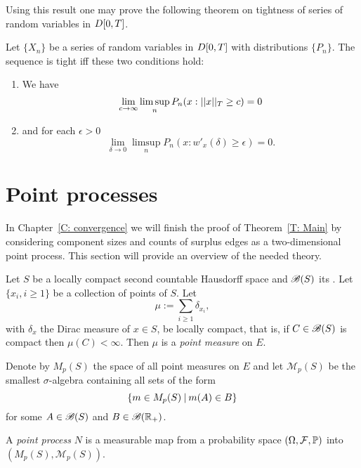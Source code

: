Using this result one may prove the following theorem on tightness of series of random variables in $D[0, T]$.

\begin{theorem} \label{T: tightness in DT}
	Let $\{X_n\}$ be a series of random variables in $D[0, T]$ with distributions $\{P_n\}$.
	The sequence is tight iff these two conditions hold:
	\begin{enumerate}
		\item We have
		\begin{equation}
		\lim_{c \rightarrow \infty} \limsup_n P_n(x: ||x||_T \geq c) = 0	
		\end{equation}
		\item and for each $\epsilon > 0$
		\begin{equation}
			\lim_{\delta \rightarrow 0} \limsup_n P_n(x: w'_x(\delta) \geq \epsilon ) = 0.
		\end{equation}
	\end{enumerate}
\end{theorem}


\section{Point processes} \label{S: point processes}

In Chapter~\ref{C: convergence} we will finish the proof of Theorem~\ref{T: Main}
by considering component sizes and counts of surplus edges as a two-dimensional point process.
This section will provide an overview of the needed theory.

\begin{definition} \label{D: point process}
	Let $S$ be a locally compact second countable Hausdorff space
	and $\mathscr{B}(S)$ its \Bosi.
	Let $\{x_i, i \geq 1\}$ be a collection of points of $S$.
	Let
	\begin{equation}
		\mu := \sum_{i \geq 1} \delta_{x_i},
	\end{equation}
	with $\delta_x$ the Dirac measure of $x \in S$,
	be locally compact, that is, 
	if $C \in \mathscr{B}(S)$ is compact then $\mu(C) < \infty$.
	Then $\mu$ is a \emph{point measure} on $E$.
	
	Denote by $M_p(S)$ the space of all point measures on $E$
	and let $\mathscr{M}_p(S)$ be the smallest $\sigma$-algebra containing all sets of the form
	\begin{equation*}
		\{ m \in M_p(S) \: | \: m(A) \in B \}
	\end{equation*}
	for some $A \in \mathscr{B}(S)$ and $B \in \mathscr{B}(\mathbb{R}_+)$.
	
	A \emph{point process} $N$ is a measurable map from a probability space
	$(\Omega, \mathcal{F}, \mathbb{P})$ into $(M_p(S), \mathscr{M}_p(S))$.
\end{definition}

